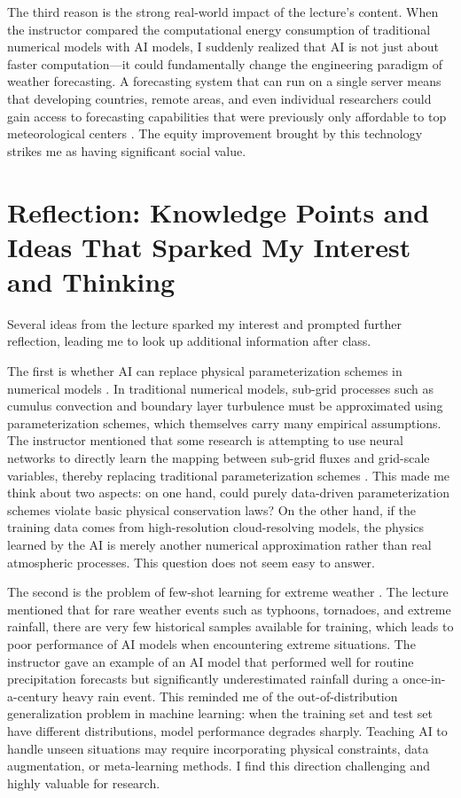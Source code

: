 \documentclass{article}
\begin{document}
The third reason is the strong real-world impact of the lecture's content. When the instructor compared the computational energy consumption of traditional numerical models with AI models, I suddenly realized that AI is not just about faster computation—it could fundamentally change the engineering paradigm of weather forecasting. A forecasting system that can run on a single server means that developing countries, remote areas, and even individual researchers could gain access to forecasting capabilities that were previously only affordable to top meteorological centers \cite{Bauer2015Quiet}. The equity improvement brought by this technology strikes me as having significant social value.

\section{Reflection: Knowledge Points and Ideas That Sparked My Interest and Thinking}

Several ideas from the lecture sparked my interest and prompted further reflection, leading me to look up additional information after class.

The first is whether AI can replace physical parameterization schemes in numerical models \cite{Schneider2017Earth}. In traditional numerical models, sub-grid processes such as cumulus convection and boundary layer turbulence must be approximated using parameterization schemes, which themselves carry many empirical assumptions. The instructor mentioned that some research is attempting to use neural networks to directly learn the mapping between sub-grid fluxes and grid-scale variables, thereby replacing traditional parameterization schemes \cite{Brenowitz2018Prognostic}. This made me think about two aspects: on one hand, could purely data-driven parameterization schemes violate basic physical conservation laws? On the other hand, if the training data comes from high-resolution cloud-resolving models, the physics learned by the AI is merely another numerical approximation rather than real atmospheric processes. This question does not seem easy to answer.

The second is the problem of few-shot learning for extreme weather \cite{Gagne2014Machine}. The lecture mentioned that for rare weather events such as typhoons, tornadoes, and extreme rainfall, there are very few historical samples available for training, which leads to poor performance of AI models when encountering extreme situations. The instructor gave an example of an AI model that performed well for routine precipitation forecasts but significantly underestimated rainfall during a once-in-a-century heavy rain event. This reminded me of the out-of-distribution generalization problem in machine learning: when the training set and test set have different distributions, model performance degrades sharply. Teaching AI to handle unseen situations may require incorporating physical constraints, data augmentation, or meta-learning methods. I find this direction challenging and highly valuable for research.
\end{document}
